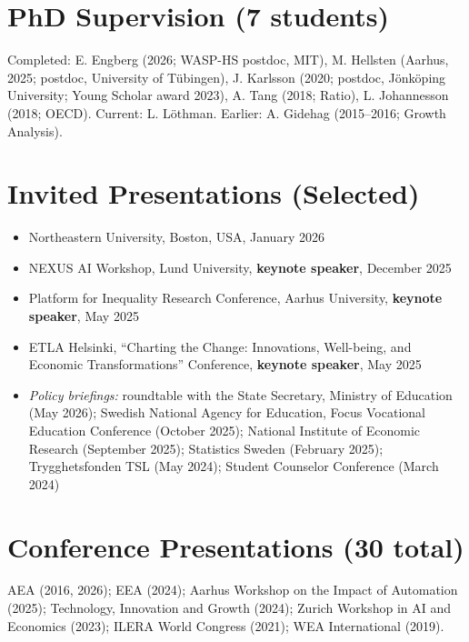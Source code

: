 \documentclass[11pt,a4paper]{article}
\newcommand{\cventry}[1]{\item #1}
\newcommand{\sectioncount}[1]{\textcolor{countgray}{\normalfont(#1)}}
\begin{document}
\section{PhD Supervision \sectioncount{7 students}}
\vspace{-2pt}
Completed: E. Engberg (2026; WASP-HS postdoc, MIT), M. Hellsten (Aarhus, 2025; postdoc, University of Tübingen), J. Karlsson (2020; postdoc, Jönköping University; Young Scholar award 2023), A. Tang (2018; Ratio), L. Johannesson (2018; OECD). Current: L. Löthman. Earlier: A. Gidehag (2015--2016; Growth Analysis). %

\section{Invited Presentations (Selected)}
\vspace{-2pt}
\begin{itemize}
\cventry{Northeastern University, Boston, USA, January 2026}
\cventry{NEXUS AI Workshop, Lund University, \textbf{keynote speaker}, December 2025}
\cventry{Platform for Inequality Research Conference, Aarhus University, \textbf{keynote speaker}, May 2025}
\cventry{ETLA Helsinki, ``Charting the Change: Innovations, Well-being, and Economic Transformations'' Conference, \textbf{keynote speaker}, May 2025}
\cventry{\textit{Policy briefings:} roundtable with the State Secretary, Ministry of Education (May 2026); Swedish National Agency for Education, Focus Vocational Education Conference (October 2025); National Institute of Economic Research (September 2025); Statistics Sweden (February 2025); Trygghetsfonden TSL (May 2024); Student Counselor Conference (March 2024)}
\end{itemize}

\section{Conference Presentations \sectioncount{30 total}}
\vspace{-2pt}
AEA (2016, 2026); EEA (2024); Aarhus Workshop on the Impact of Automation (2025); Technology, Innovation and Growth (2024); Zurich Workshop in AI and Economics (2023); ILERA World Congress (2021); WEA International (2019).
\end{document}
